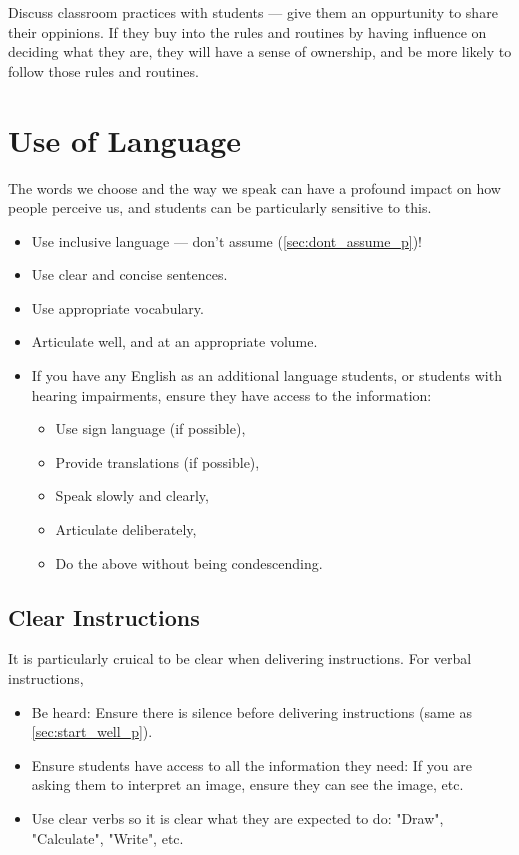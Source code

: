 \documentclass[12pt]{report}
\begin{document}
Discuss classroom practices with students --- give them an oppurtunity to share their oppinions. If they buy into the rules and routines by having influence on deciding what they are, they will have a sense of ownership, and be more likely to follow those rules and routines.



\section{Use of Language}
\label{sec:language_p}

The words we choose and the way we speak can have a profound impact on how people perceive us, and students can be particularly sensitive to this.

\begin{itemize}
  \item Use inclusive language --- don't assume (\ref{sec:dont_assume_p})!
  \item Use clear and concise sentences.
  \item Use appropriate vocabulary.
  \item Articulate well, and at an appropriate volume.
  \item If you have any English as an additional language students, or students with hearing impairments, ensure they have access to the information: 
  \begin{itemize}
    \item Use sign language (if possible), 
    \item Provide translations (if possible), 
    \item Speak slowly and clearly, 
    \item Articulate deliberately,
    \item Do the above without being condescending.
  \end{itemize}
\end{itemize}

\subsection{Clear Instructions}
\label{sec:clear_instructions_p}

It is particularly cruical to be clear when delivering instructions. For verbal instructions,
\begin{itemize}
  \item Be heard: Ensure there is silence before delivering instructions (same as \ref{sec:start_well_p}).
  \item Ensure students have access to all the information they need: If you are asking them to interpret an image, ensure they can see the image, etc. 
  \item Use clear verbs so it is clear what they are expected to do: "Draw", "Calculate", "Write", etc.
\end{itemize}
\end{document}
